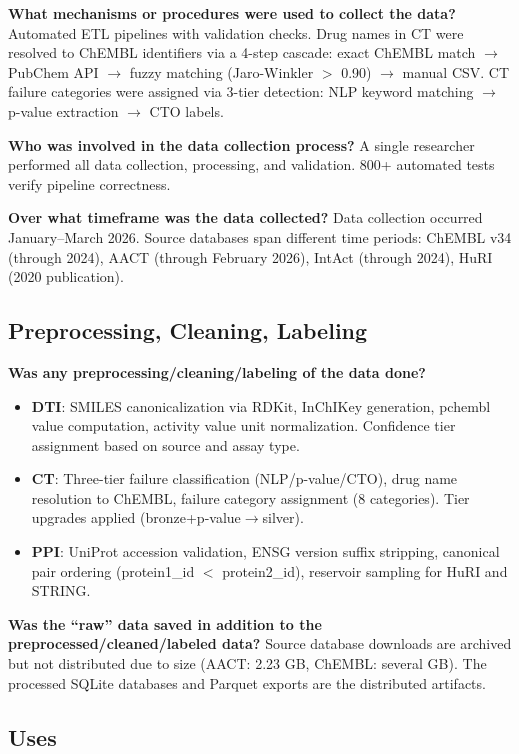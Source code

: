 \textbf{What mechanisms or procedures were used to collect the data?}
Automated ETL pipelines with validation checks. Drug names in CT were resolved to ChEMBL identifiers via a 4-step cascade: exact ChEMBL match $\to$ PubChem API $\to$ fuzzy matching (Jaro-Winkler $>$ 0.90) $\to$ manual CSV. CT failure categories were assigned via 3-tier detection: NLP keyword matching $\to$ p-value extraction $\to$ CTO labels.

\textbf{Who was involved in the data collection process?}
A single researcher performed all data collection, processing, and validation. 800+ automated tests verify pipeline correctness.

\textbf{Over what timeframe was the data collected?}
Data collection occurred January--March 2026. Source databases span different time periods: ChEMBL v34 (through 2024), AACT (through February 2026), IntAct (through 2024), HuRI (2020 publication).

\subsection{Preprocessing, Cleaning, Labeling}

\textbf{Was any preprocessing/cleaning/labeling of the data done?}
\begin{itemize}[nosep,leftmargin=*]
    \item \textbf{DTI}: SMILES canonicalization via RDKit, InChIKey generation, pchembl value computation, activity value unit normalization. Confidence tier assignment based on source and assay type.
    \item \textbf{CT}: Three-tier failure classification (NLP/p-value/CTO), drug name resolution to ChEMBL, failure category assignment (8 categories). Tier upgrades applied (bronze+p-value$\to$silver).
    \item \textbf{PPI}: UniProt accession validation, ENSG version suffix stripping, canonical pair ordering (protein1\_id $<$ protein2\_id), reservoir sampling for HuRI and STRING.
\end{itemize}

\textbf{Was the ``raw'' data saved in addition to the preprocessed/cleaned/labeled data?}
Source database downloads are archived but not distributed due to size (AACT: 2.23 GB, ChEMBL: several GB). The processed SQLite databases and Parquet exports are the distributed artifacts.

\subsection{Uses}

